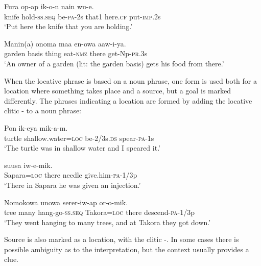\ea%
\label{ex:4:x871}
\gll Fura  op-ap  ik-o-n  nain    wu-e. \\
    knife  hold-\textsc{ss}.\textsc{seq}  be-\textsc{pa}-2s  that1  here.\textsc{cf}  put-\textsc{imp}.2s  \\
\glt`Put here the knife that you are holding.'
\z

\ea%
\label{ex:4:x1833}
\gll Manin(a)  onoma  maa  en-owa    aaw-i-ya. \\
    garden  basis  thing  eat-\textsc{nmz}  there  get-Np-\textsc{pr}.3s  \\
\glt`An owner of a garden (lit: the garden basis) gets his food from there.'
\z

When the locative phrase is based on a noun phrase, one form is used both for  a location where something takes place and a source, but a goal is marked differently.  The phrases indicating a location are formed by adding the locative clitic \nobreakdash-  to a noun phrase:

\ea%
\label{ex:4:x856}
\gll Pon    ik-eya  mik-a-m. \\
     turtle  shallow.water=\textsc{loc}  be-2/3s.\textsc{ds}  spear-\textsc{pa}-1s \\
\glt`The turtle was in shallow water and I speared it.'
\z

\ea%
\label{ex:4:x857}
\gll {}   suusa  iw-e-mik. \\
   Sapara=\textsc{loc}  there  needle  give.him-\textsc{pa}-1/3p   \\
\glt`There in Sapara he was given an injection.'
\z

\ea%
\label{ex:4:x865}
\gll Nomokowa  unowa  serer-iw-ap    or-o-mik.\\
   tree  many  hang-go-\textsc{ss}.\textsc{seq}  Takora=\textsc{loc}  there  descend-\textsc{pa}-1/3p   \\
\glt`They went hanging to many trees, and at Takora they got down.'
\z

Source is also marked as a location, with the clitic -. In some cases there is possible ambiguity as to the interpretation, but the context usually provides a clue.

